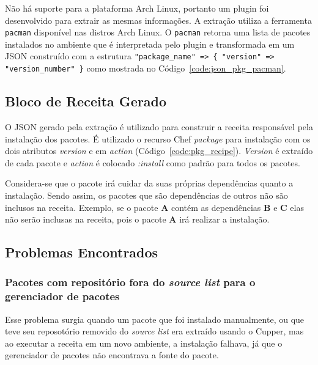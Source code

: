 Não há suporte para a plataforma Arch Linux, portanto um plugin foi desenvolvido
para extrair as mesmas informações. A extração utiliza a ferramenta \texttt{pacman} disponível
nas distros Arch Linux. O \texttt{pacman} retorna uma lista de pacotes instalados no ambiente
que é interpretada pelo plugin e transformada em um JSON construído com a estrutura
\texttt{"package\_name" => \{ "version" => "version\_number" \}} como mostrada no
Código~\ref{code:json_pkg_pacman}.

\noindent\begin{minipage}{\textwidth}
  \lstset{style=shell}
  
\end{minipage}\hfill

\subsection{Bloco de Receita Gerado}

O JSON gerado pela extração é utilizado para construir a receita responsável pela instalação dos
pacotes. É utilizado o recurso Chef \textit{package} para instalação com os dois atributos
\textit{version} e em \textit{action} (Código~\ref{code:pkg_recipe}). \textit{Version}
é extraído de cada pacote e \textit{action} é colocado \textit{\textit{:install}} como padrão para todos os pacotes.

\noindent\begin{minipage}{\textwidth}
  \lstset{style=shell}
  
\end{minipage}\hfill

Considera-se que o pacote irá cuidar da suas próprias dependências quanto a instalação.
Sendo assim, os pacotes que são dependências de outros não são inclusos na receita. Exemplo, se o pacote
\textbf{A} contém as dependências \textbf{B} e \textbf{C} elas não serão inclusas na receita, pois o pacote \textbf{A} irá realizar a instalação.

\subsection{Problemas Encontrados}

\subsubsection{Pacotes com repositório fora do \textit{source list} para o 
gerenciador de pacotes}
Esse problema surgia quando um pacote que foi instalado manualmente, ou que
teve seu reposotório removido do \textit{source list} era extraído usando o Cupper,
mas ao executar a receita em um novo ambiente, a instalação falhava, já que 
o gerenciador de pacotes não encontrava a fonte do pacote.

